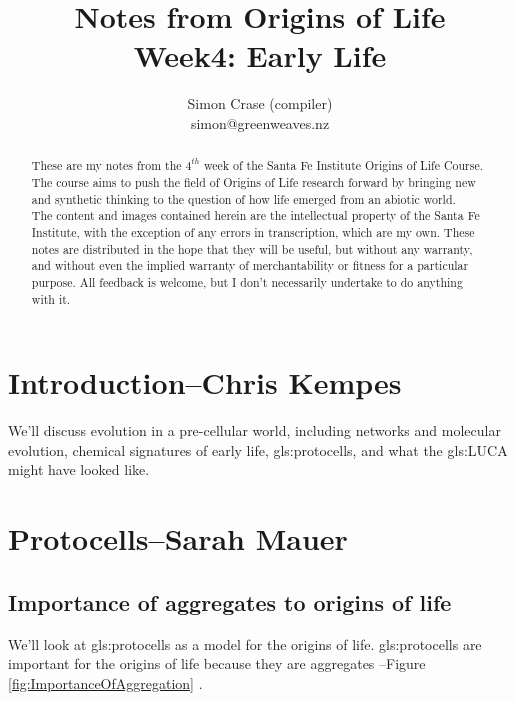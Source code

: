 \documentclass[]{article}
\title{Notes from Origins of Life\\Week4: Early Life}
\author{Simon Crase (compiler)\\simon@greenweaves.nz}
\begin{document}
\maketitle

\begin{abstract}
   These are my notes from the $4^{th}$ week of the Santa Fe Institute Origins of Life Course\cite{sfi2020}. The course aims to push the field of Origins of Life research forward by bringing new and synthetic thinking to the question of how life emerged from an abiotic world.\\
   The content and images contained herein are the intellectual property of the Santa Fe Institute, with the exception of any errors in transcription, which are my own.
   These notes are distributed in the hope that they will be useful,
   but without any warranty, and without even the implied warranty of
   merchantability or fitness for a particular purpose. All feedback is welcome,
   but I don't necessarily undertake to do anything with it.
\end{abstract}

\setcounter{tocdepth}{2}
\tableofcontents
\listoffigures
\section[Introduction]{Introduction--Chris Kempes}

We'll discuss evolution in a pre-cellular world, including  networks and molecular evolution, chemical signatures of early life, \glspl{gls:protocell}, and what the \gls{gls:LUCA} might have looked like.

\section[Protocells]{Protocells--Sarah Mauer}

\subsection{Importance of aggregates to origins of life}
We'll look at \glspl{gls:protocell} as a model for the origins of life. \Glspl{gls:protocell} are important for the origins of life because they are aggregates --Figure \ref{fig:ImportanceOfAggregation} \cite{deamer2017role,maurer2011primitive,segre2001lipid}.
\end{document}
